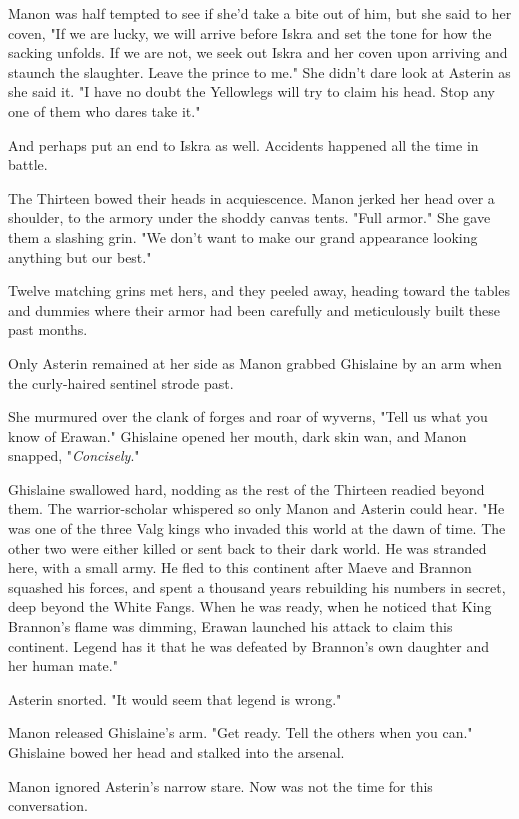 Manon was half tempted to see if she'd take a bite out of him, but she said to her coven, "If we are lucky, we will arrive before Iskra and set the tone for how the sacking unfolds.
If we are not, we seek out Iskra and her coven upon arriving and staunch the slaughter.
Leave the prince to me."
She didn't dare look at Asterin as she said it.
"I have no doubt the Yellowlegs will try to claim his head.
Stop any one of them who dares take it."

And perhaps put an end to Iskra as well.
Accidents happened all the time in battle.

The Thirteen bowed their heads in acquiescence.
Manon jerked her head over a shoulder, to the armory under the shoddy canvas tents.
"Full armor."
She gave them a slashing grin.
"We don't want to make our grand appearance looking anything but our best."

Twelve matching grins met hers, and they peeled away, heading toward the tables and dummies where their armor had been carefully and meticulously built these past months.

Only Asterin remained at her side as Manon grabbed Ghislaine by an arm when the curly-haired sentinel strode past.

She murmured over the clank of forges and roar of wyverns, "Tell us what you know of Erawan."
Ghislaine opened her mouth, dark skin wan, and Manon snapped, "\emph{Concisely}."

Ghislaine swallowed hard, nodding as the rest of the Thirteen readied beyond them.
The warrior-scholar whispered so only Manon and Asterin could hear.
"He was one of the three Valg kings who invaded this world at the dawn of time.
The other two were either killed or sent back to their dark world.
He was stranded here, with a small army.
He fled to this continent after Maeve and Brannon squashed his forces, and spent a thousand years rebuilding his numbers in secret, deep beyond the White Fangs.
When he was ready, when he noticed that King Brannon's flame was dimming, Erawan launched his attack to claim this continent.
Legend has it that he was defeated by Brannon's own daughter and her human mate."

Asterin snorted.
"It would seem that legend is wrong."

Manon released Ghislaine's arm.
"Get ready.
Tell the others when you can."
Ghislaine bowed her head and stalked into the arsenal.

Manon ignored Asterin's narrow stare.
Now was not the time for this conversation.


